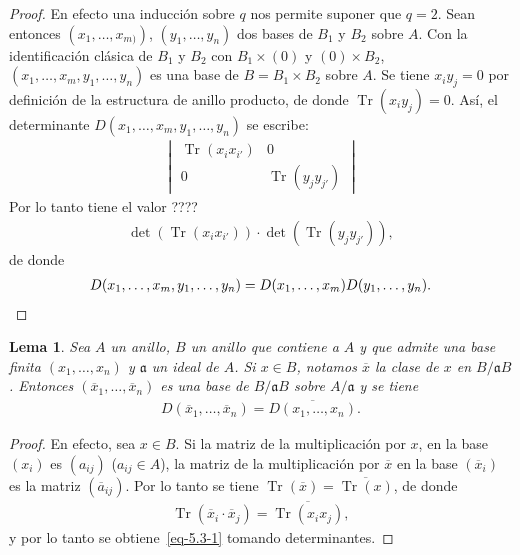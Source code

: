 \documentclass[10pt,oneside,bibtotoc,smallheadings,leqno,a5paper,DIV=12]{scrbook}
\newcommand{\idl}[1]{\mathfrak{#1}}
\newcommand{\QED}{}%
\newcommand{\oline}[1]{\overline{#1}}
\DeclareMathOperator{\Tr}{Tr}
\numberwithin{equation}{section}
\theoremstyle{defi}
\theoremstyle{enonce}
\newtheorem{lemma}{Lema}
\theoremstyle{rem}
\numberwithin{theorem}{section}
\numberwithin{proposition}{section}
\numberwithin{definition}{section}
\numberwithin{lemma}{section}
\numberwithin{corollary}{section}
\numberwithin{example}{section}
\numberwithin{footnote}{section}%
\begin{document}
\begin{proof}
En efecto una inducci\'on sobre $q$ nos permite suponer que $q=2$. Sean entonces $(x_{1},\dots,x_{m)})$,
$(y_{1},\dots,y_{n})$ dos bases de $B_{1}$ y $B_{2}$ sobre $A$. Con la identificaci\'on cl\'asica de $B_{1}$ y
$B_{2}$ con $B_{1}\times(0)$ y $(0)\times B_{2}$, $(x_{1},\dots,x_{m},y_{1},\dots,y_{n})$ es una base de
$B = B_{1}\times B_{2}$ sobre $A$. Se tiene $x_{i}y_{j}=0$ por definici\'on de la estructura de anillo producto,
de donde $\Tr(x_{i}y_{j}) = 0$. As\'i, el determinante $D(x_{1},\dots,x_{m},y_{1},\dots,y_{n})$ se escribe:
\begin{gather*}
\begin{vmatrix}
\Tr(x_{i}x_{i'}) & 0\\
0 & \Tr(y_{j}y_{j'})
\end{vmatrix}
\end{gather*}
Por lo tanto tiene el valor ????
\begin{gather*}
\det(\Tr(x_{i}x_{i'}))\cdot\det(\Tr(y_{j}y_{j'})),
\end{gather*}
de donde
\begin{gather*}
D(x_{1},\dots,x_{m},y_{1},\dots,y_{n}) = D(x_{1},\dots,x_{m})D(y_{1},\dots,y_{n}).\qedhere%
\end{gather*}
\end{proof}

\begin{lemma}\label{lem5.3.2}
Sea $A$ un anillo, $B$ un anillo que contiene a $A$ y que admite una base finita $(x_{1},\dots,x_{n})$ y
$\idl{a}$ un ideal de $A$. Si $x\in B$, notamos $\oline x$ la clase de $x$ en $B/\idl{a}B$. Entonces
$(\oline x_{1},\dots,\oline x_{n})$ es una base de $B/\idl{a}B$ sobre $A/\idl{a}$ y se tiene
\begin{gather}\label{eq-5.3-1}
D(\oline x_{1},\dots,\oline x_{n}) = \oline{D(x_{1},\dots,x_{n})}.
\end{gather}
\end{lemma}

\begin{proof}
En efecto, sea $x\in B$. Si la matriz de la multiplicaci\'on por $x$, en la base $(x_{i})$ es $(a_{ij})$
($a_{ij}\in A$), la matriz de la multiplicaci\'on por $\oline x$ en la base $(\oline x_{i})$ es la matriz
$(\oline a_{ij})$. Por lo tanto se tiene $\Tr(\oline x) = \oline{\Tr(x)}$, de donde
\begin{gather*}
\Tr(\oline x_{i}\cdot\oline x_{j}) = \oline{\Tr(x_{i}x_{j})},
\end{gather*}
y por lo tanto se obtiene~\eqref{eq-5.3-1} tomando determinantes.
\end{proof}
\end{document}
